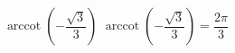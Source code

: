  {$\operatorname{arccot} \left( -\dfrac{\sqrt{3}}{3} \right)$}
{ $\operatorname{arccot} \left( -\dfrac{\sqrt{3}}{3} \right) = \dfrac{2\pi}{3}$}
